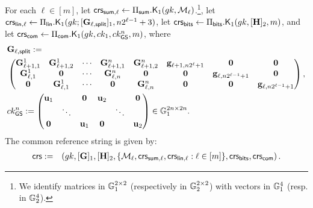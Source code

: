 \begin{description}
For each $\ell\in[m]$, let
\(\mathsf{crs}_{\mathsf{sum},\ell} \gets \Pi_{\mathsf{sum}}.\mathsf{K}_1({gk}, \mathcal{M}_\ell)\).\footnote{We identify
matrices in \(\mathbb{G}_1^{2 \times 2}\) (respectively in \(\mathbb{G}_2^{2 \times 2}\)) with vectors in \(\mathbb{G}_1^{4}\) (resp. in \(\mathbb{G}_2^{4}\)).}, let \(\mathsf{crs}_{\mathsf{lin},\ell}\gets \Pi_\mathsf{lin}.\mathsf{K}_1(gk;\allowbreak[\mathbf{{G}}_{\ell,\mathsf{split}}]_1,n2^{\ell-1}+3)\), let \(\mathsf{crs}_{\mathsf{bits}}\gets\Pi_{\mathsf{bits}}.\mathsf{K}_1(gk,[\mathbf{{H}}]_2,m)\), and let \(\mathsf{crs}_{\mathsf{com}} \gets \Pi_{\mathsf{com}}.\mathsf{K}_1({gk}, ck_1,ck_{\mathsf{GS}}^n,m)\), where
\begin{align*}
&\mathbf{{G}}_{\ell,\mathsf{split}}:=\\
&\begin{pmatrix}
\mathbf{{G}}^1_{\ell+1,1} & \mathbf{{G}}^1_{\ell+1,2} & \cdots & \mathbf{{G}}^n_{\ell+1,1} & \mathbf{{G}}^n_{\ell+1,2} & \mathbf{g}_{\ell+1,n2^\ell+1} & \mathbf{{0}}                       & \mathbf{{0}}\\
\mathbf{{G}}^1_{\ell,1}   & \mathbf{{0}}              & \cdots & \mathbf{{G}}^n_{\ell,n}   & \mathbf{{0}}              & \mathbf{{0}}                  & \mathbf{g}_{\ell,n2^{\ell-1}+1}  & \mathbf{{0}}\\
\mathbf{{0}}              & \mathbf{{G}}^1_{\ell,1}   & \cdots & \mathbf{{0}}              & \mathbf{{G}}^n_{\ell,n}   & \mathbf{{0}}                  & \mathbf{{0}}                       & \mathbf{g}_{\ell,n2^{\ell-1}+1}
\end{pmatrix},\\
&ck_{\mathsf{GS}}^n:=\left(\begin{matrix}
    \mathbf{u}_1 &        & \mathbf{0}   & \mathbf{u}_2 &        & \mathbf{0}\\
               & \ddots &            &            & \ddots &         \\
    \mathbf{0}   &        & \mathbf{u}_1 & \mathbf{0}   &        & \mathbf{u}_2
\end{matrix}\right)\in\mathbb{G}_1^{2n\times2n}.
\end{align*}
The common reference string is given by:
\begin{eqnarray*}
\mathsf{crs}&:=&\left( gk, [\mathbf{{G}}]_1,
    [\mathbf{{H}}]_2, \{\mathcal{M}_\ell,\mathsf{crs}_{\mathsf{sum},\ell},\mathsf{crs}_{\mathsf{lin},\ell}:\ell\in [m]\},\mathsf{crs}_{\mathsf{bits}},\mathsf{crs}_{\mathsf{com}} \right).
 \end{eqnarray*}



\end{description}
